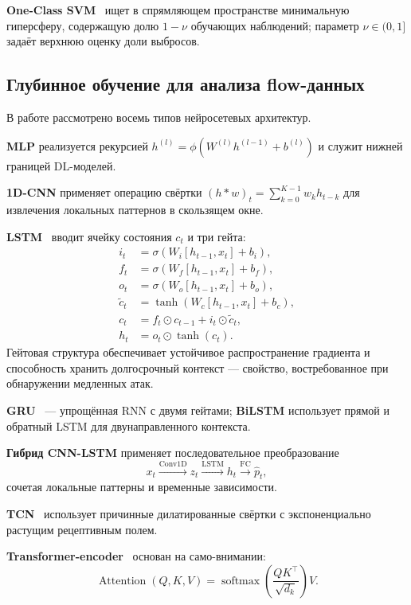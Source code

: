 \textbf{One-Class SVM}~\cite{scholkopf2001ocsvm} ищет в спрямляющем
пространстве минимальную гиперсферу, содержащую долю \(1-\nu\)
обучающих наблюдений; параметр \(\nu \in (0,1]\) задаёт верхнюю
оценку доли выбросов.

\subsection{Глубинное обучение для анализа flow-данных}

В работе рассмотрено восемь типов нейросетевых архитектур.

\textbf{MLP} реализуется рекурсией
\(h^{(l)} = \phi(W^{(l)} h^{(l-1)} + b^{(l)})\) и служит нижней
границей DL-моделей.

\textbf{1D-CNN} применяет операцию свёртки
\((h * w)_t = \sum_{k=0}^{K-1} w_k h_{t-k}\) для извлечения локальных
паттернов в скользящем окне.

\textbf{LSTM}~\cite{hochreiter1997lstm} вводит ячейку состояния
\(c_t\) и три гейта:
\begin{align}
i_t &= \sigma(W_i [h_{t-1}, x_t] + b_i), \nonumber\\
f_t &= \sigma(W_f [h_{t-1}, x_t] + b_f), \nonumber\\
o_t &= \sigma(W_o [h_{t-1}, x_t] + b_o), \nonumber\\
\tilde{c}_t &= \tanh(W_c [h_{t-1}, x_t] + b_c), \nonumber\\
c_t &= f_t \odot c_{t-1} + i_t \odot \tilde{c}_t, \nonumber\\
h_t &= o_t \odot \tanh(c_t).
\label{eq:lstm}
\end{align}
Гейтовая структура обеспечивает устойчивое распространение градиента и
способность хранить долгосрочный контекст --- свойство, востребованное
при обнаружении медленных атак.

\textbf{GRU}~\cite{cho2014gru} --- упрощённая RNN с двумя гейтами;
\textbf{BiLSTM} использует прямой и обратный LSTM для двунаправленного
контекста.

\textbf{Гибрид CNN-LSTM} применяет последовательное преобразование
\[
x_t \xrightarrow{\text{Conv1D}} z_t \xrightarrow{\text{LSTM}} h_t
\xrightarrow{\text{FC}} \hat{p}_t,
\]
сочетая локальные паттерны и временные зависимости.

\textbf{TCN}~\cite{bai2018tcn} использует причинные дилатированные
свёртки с экспоненциально растущим рецептивным полем.

\textbf{Transformer-encoder}~\cite{vaswani2017attention} основан на
само-внимании:
\begin{equation}
\operatorname{Attention}(Q, K, V) =
\operatorname{softmax}\!\left(\frac{QK^{\top}}{\sqrt{d_k}}\right) V.
\label{eq:attention}
\end{equation}

